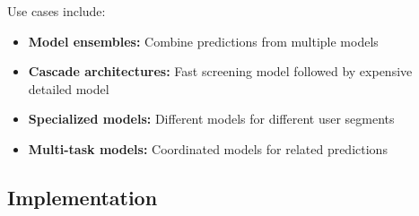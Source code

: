 Use cases include:
\begin{itemize}
    \item \textbf{Model ensembles:} Combine predictions from multiple models
    \item \textbf{Cascade architectures:} Fast screening model followed by expensive detailed model
    \item \textbf{Specialized models:} Different models for different user segments
    \item \textbf{Multi-task models:} Coordinated models for related predictions
\end{itemize}

\subsection{Implementation}


